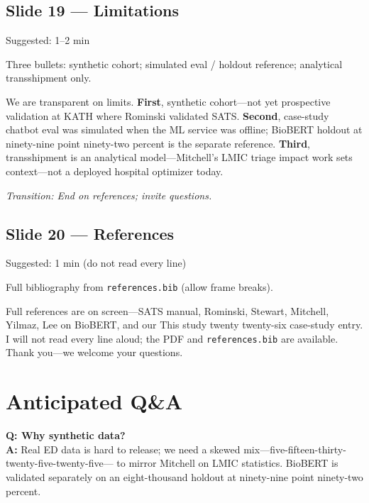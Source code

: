 \documentclass[11pt]{article}
\newcommand{\transition}[1]{\medskip\noindent\textit{\textcolor{knustMuted}{Transition: #1}}\medskip}
\newcommand{\deck}[1]{{\small\texttt{\textcolor{knustMuted}{main.pdf slide: #1}}}}
\newcommand{\slide}[3]{%
  \subsection{Slide #1 --- #2}%
  \noindent\deck{#1 --- #3}\par\smallskip}
\begin{document}
\slide{19}{Limitations}{Conclusion}
\begin{timing}Suggested: 1--2 min\end{timing}
\begin{onscreen}
Three bullets: synthetic cohort; simulated eval / holdout reference; analytical transshipment only.
\end{onscreen}
\begin{saybox}
We are transparent on limits. \textbf{First}, synthetic cohort---not yet prospective validation at KATH
where Rominski validated SATS. \textbf{Second}, case-study chatbot eval was simulated when the ML
service was offline; BioBERT holdout at ninety-nine point ninety-two percent is the separate reference.
\textbf{Third}, transshipment is an analytical model---Mitchell's LMIC triage impact work sets context---not
a deployed hospital optimizer today.
\end{saybox}
\transition{End on references; invite questions.}

\slide{20}{References}{Closing}
\begin{timing}Suggested: 1 min (do not read every line)\end{timing}
\begin{onscreen}
Full bibliography from \texttt{references.bib} (allow frame breaks).
\end{onscreen}
\begin{saybox}
Full references are on screen---SATS manual, Rominski, Stewart, Mitchell, Yilmaz, Lee on BioBERT, and
our This study twenty twenty-six case-study entry. I will not read every line aloud; the PDF and
\texttt{references.bib} are available. Thank you---we welcome your questions.
\end{saybox}

\newpage
\section{Anticipated Q\&A}

\begin{qabox}
\textbf{Q: Why synthetic data?}\\
\textbf{A:} Real ED data is hard to release; we need a skewed mix---five-fifteen-thirty-twenty-five-twenty-five---
to mirror Mitchell on LMIC statistics. BioBERT is validated separately on an eight-thousand holdout at
ninety-nine point ninety-two percent.
\end{qabox}
\end{document}
